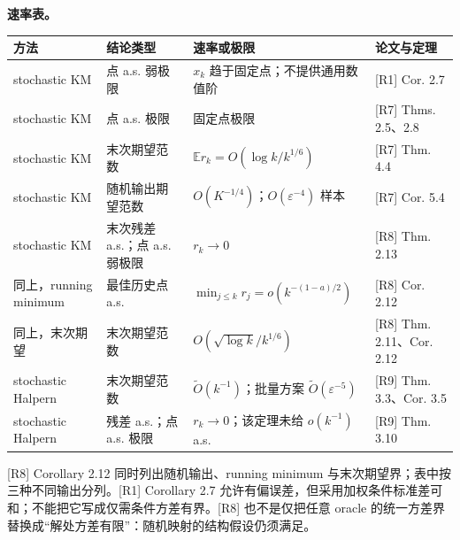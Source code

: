 \documentclass[
  chinese,
  10pt,
  a4paper,
]{article}
\newcounter{none} %
\begin{document}
\textbf{速率表。}

{\def\LTcaptype{none} %
\begin{longtable}[]{@{}
  >{\raggedright\arraybackslash}p{}
  >{\raggedright\arraybackslash}p{}
  >{\raggedright\arraybackslash}p{}
  >{\raggedright\arraybackslash}p{}@{}}
\toprule\noalign{}
\begin{minipage}[b]{\linewidth}\raggedright
方法
\end{minipage} & \begin{minipage}[b]{\linewidth}\raggedright
结论类型
\end{minipage} & \begin{minipage}[b]{\linewidth}\raggedright
速率或极限
\end{minipage} & \begin{minipage}[b]{\linewidth}\raggedright
论文与定理
\end{minipage} \\
\midrule\noalign{}
\endhead
\bottomrule\noalign{}
\endlastfoot
stochastic KM & 点 a.s. 弱极限 & \(x_k\) 趋于固定点；不提供通用数值阶 &
{[}R1{]} Cor. 2.7 \\
stochastic KM & 点 a.s. 极限 & 固定点极限 & {[}R7{]} Thms. 2.5、2.8 \\
stochastic KM & 末次期望范数 & \(\mathbb E r_k=O(\log k/k^{1/6})\) &
{[}R7{]} Thm. 4.4 \\
stochastic KM & 随机输出期望范数 &
\(O(K^{-1/4})\)；\(O(\varepsilon^{-4})\) 样本 & {[}R7{]} Cor. 5.4 \\
stochastic KM & 末次残差 a.s.；点 a.s. 弱极限 & \(r_k\to0\) & {[}R8{]}
Thm. 2.13 \\
同上，running minimum & 最佳历史点 a.s. &
\(\min_{j\le k}r_j=o(k^{-(1-a)/2})\) & {[}R8{]} Cor. 2.12 \\
同上，末次期望 & 末次期望范数 & \(O(\sqrt{\log k}/k^{1/6})\) & {[}R8{]}
Thm. 2.11、Cor. 2.12 \\
stochastic Halpern & 末次期望范数 & \(\widetilde O(k^{-1})\)；批量方案
\(\widetilde O(\varepsilon^{-5})\) & {[}R9{]} Thm. 3.3、Cor. 3.5 \\
stochastic Halpern & 残差 a.s.；点 a.s. 极限 & \(r_k\to0\)；该定理未给
\(o(k^{-1})\) a.s. & {[}R9{]} Thm. 3.10 \\
\end{longtable}
}

{[}R8{]} Corollary 2.12 同时列出随机输出、running minimum
与末次期望界；表中按三种不同输出分列。{[}R1{]} Corollary 2.7
允许有偏误差，但采用加权条件标准差可和；不能把它写成仅需条件方差有界。{[}R8{]}
也不是仅把任意 oracle
的统一方差界替换成``解处方差有限''：随机映射的结构假设仍须满足。
\end{document}
